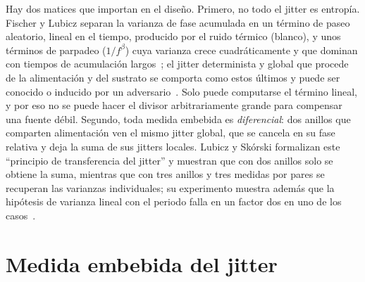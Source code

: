 Hay dos matices que importan en el diseño. Primero, no todo el jitter es
entropía. Fischer y Lubicz separan la varianza de fase acumulada en un
término de paseo aleatorio, lineal en el tiempo, producido por el ruido
térmico (blanco), y unos términos de parpadeo ($1/f^\beta$) cuya varianza
crece cuadráticamente y que dominan con tiempos de acumulación
largos~\cite{fischer_2014_embedded}; el jitter determinista y global que
procede de la alimentación y del sustrato se comporta como estos últimos
y puede ser conocido o inducido por un
adversario~\cite{fischer_2008_enhancing}. Solo puede computarse el
término lineal, y por eso no se puede hacer el divisor arbitrariamente
grande para compensar una fuente débil. Segundo, toda medida embebida es
\emph{diferencial}: dos anillos que comparten alimentación ven el mismo
jitter global, que se cancela en su fase relativa y deja la suma de sus
jitters locales. Lubicz y Sk\'orski formalizan este ``principio de
transferencia del jitter'' y muestran que con dos anillos solo se obtiene
la suma, mientras que con tres anillos y tres medidas por pares se
recuperan las varianzas individuales; su experimento muestra además que
la hipótesis de varianza lineal con el periodo falla en un factor dos en
uno de los casos~\cite{lubicz_2024_jitter}.

\section{Medida embebida del jitter}
\label{sec:soa_jitter}


